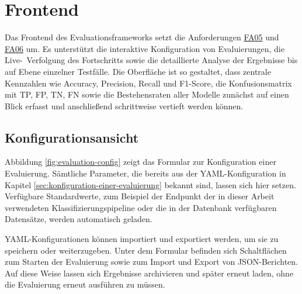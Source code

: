 \section{Frontend}\label{sec:visualisierung-im-frontend}

Das Frontend des Evaluationsframeworks setzt die Anforderungen \hyperlink{FA05}{FA05} und \hyperlink{FA06}{FA06} um. Es unterstützt die interaktive Konfiguration von Evaluierungen, die Live-\linebreak~Verfolgung des Fortschritts sowie die detaillierte Analyse der Ergebnisse bis auf Ebene einzelner Testfälle. Die Oberfläche ist so gestaltet, dass zentrale Kennzahlen wie Accuracy, Precision, Recall und F1-Score, die Konfusionsmatrix mit \ac{TP}, \ac{FP}, \ac{TN}, \ac{FN} sowie die Bestehensraten aller Modelle zunächst auf einen Blick erfasst und anschließend schrittweise vertieft werden können.

\subsection*{Konfigurationsansicht}

Abbildung \ref{fig:evaluation-config} zeigt das Formular zur Konfiguration einer Evaluierung. Sämtliche Parameter, die bereits aus der YAML-Konfiguration in Kapitel \ref{sec:konfiguration-einer-evaluierung} bekannt sind, lassen sich hier setzen. Verfügbare Standardwerte, zum Beispiel der Endpunkt der in dieser Arbeit verwendeten Klassifizierungspipeline oder die in der Datenbank verfügbaren Datensätze, werden automatisch geladen.

YAML-Konfigurationen können importiert und exportiert werden, um sie zu speichern oder weiterzugeben. Unter dem Formular befinden sich Schaltflächen zum Starten der Evaluierung sowie zum Import und Export von JSON-Berichten. Auf diese Weise lassen sich Ergebnisse archivieren und später erneut laden, ohne die Evaluierung erneut ausführen zu müssen.

